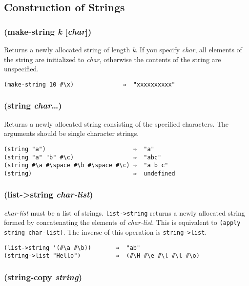 \documentclass{article}
\begin{document}
\subsection{Construction of Strings}\label{sec:construction-of-strings}

\subsubsection{(make-string \emph{k} [\emph{char}])}

Returns a newly allocated string of length \emph{k}. If you specify \emph{char}, all elements
of the string are initialized to \emph{char}, otherwise the contents of the string are
unspecified.

\begin{verbatim}
(make-string 10 #\x)              ⇒  "xxxxxxxxxx"
\end{verbatim}

\subsubsection{(string \emph{char}\ldots{})}

Returns a newly allocated string consisting of the specified characters. The arguments should
be single character strings.

\begin{verbatim}
(string "a")                         ⇒  "a"
(string "a" "b" #\c)                 ⇒  "abc"
(string #\a #\space #\b #\space #\c) ⇒  "a b c"
(string)                             ⇒  undefined
\end{verbatim}

\subsubsection{(list-\textgreater{}string \emph{char-list})}

\emph{char-list} must be a list of strings. \verb|list->string| returns a newly
allocated string formed by concatenating the elements of \emph{char-list}. This is equivalent
to \verb|(apply string char-list)|. The inverse of this operation is
\verb|string->list|.

\begin{verbatim}
(list->string '(#\a #\b))       ⇒  "ab"
(string->list "Hello")          ⇒  (#\H #\e #\l #\l #\o)
\end{verbatim}

\subsubsection{(string-copy \emph{string})}
\end{document}

